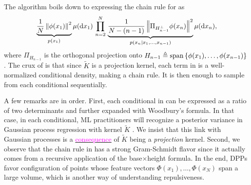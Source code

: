 \documentclass[twoside,11pt]{article}
\begin{document}
          The algorithm boils down to expressing the chain rule for  as
          \begin{equation}
          \label{eq:joint_distribution2}
            \underbrace{
              \frac{1}{N}
                \left\| \phi(x_1) \right\|^2
              }_{p(x_1)}
                  \mu(\mathop{}\!\mathrm{d} x_1)
            \,\prod_{n=2}^{N}\,
            \underbrace{
              \frac{1}{N-(n-1)}
                \left\|  \Pi_{H_{n-1}^{\perp}} \phi(x_n) \right\|^2
              }_{p(x_n\vert x_1,\dots,x_{n-1})}
                  \mu(\mathop{}\!\mathrm{d} x_n),
          \end{equation}
          where $\Pi_{H_{n-1}}$ is the orthogonal projection onto $H_{n-1} \triangleq \operatorname{span}\left\{ \phi(x_1), \dots, \phi(x_{n-1})  \right\}$.
          The crux of \citet[Algorithm 18]{HKPV06} is that since $\tilde K$ is a projection kernel, each term in  is a well-normalized conditional density, making  a chain rule.
          It is then enough to sample from each conditional sequentially.

          A few remarks are in order.
          First, each conditional in  can be expressed as a ratio of two determinants and further expanded with Woodbury's formula.
          In that case, in each conditional, ML practitioners will recognize  a posterior variance in Gaussian process regression with kernel $\tilde K$ \cite[Equation 2.26]{RaWi06}.
          We insist that this link with Gaussian processes is a \href{https://dppy.readthedocs.io/en/latest/finite_dpps/exact_sampling.html#caution}{\textcolor{magenta}{consequence}} of $\tilde K$ being a \emph{projection} kernel.
          Second, we observe that the chain rule in  has a strong Gram-Schmidt flavor since it actually comes from a recursive application of the base$\times$height formula.
          In the end, DPPs favor configuration of points whose feature vectors $\Phi(x_1),\dots, \Phi(x_N)$ span a large volume, which is another way of understanding repulsiveness.
\end{document}
